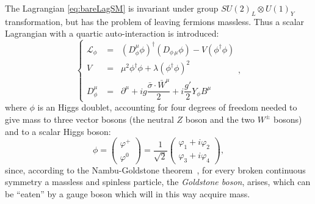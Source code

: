 The Lagrangian \ref{eq:bareLagSM} is invariant under group 
$SU(2)_{L} \otimes U(1)_{Y}$ transformation, but has the 
problem of leaving fermions massless. Thus a scalar 
Lagrangian with a quartic auto-interaction is introduced:
\begin{equation}\label{eq:lagScalar}
\left \{ \begin{array}{cl}
\mathcal{L}_{\phi} &=\;\;  (D_{\phi}^{\mu} \phi)^{\dag}(D_{\phi\,\mu} \phi) - V(\phi^{\dag}\phi)\\
V &=\;\; \mu^{2}\phi^{\dag}\phi + \lambda(\phi^{\dag}\phi)^{2}\\
D_{\phi}^{\mu} &=\;\; \partial^{\mu} + ig\dfrac{\bar{\sigma}\cdot\bar{W}^{\mu}}{2} + i\dfrac{g'}{2}Y_{\phi}B^{\mu}
\end{array}\right. ,
\end{equation}
where $\phi$ is an Higgs doublet, accounting for four 
degrees of freedom needed to give mass to three vector
bosons (the neutral $Z$ boson and the two $W^{\pm}$ bosons)
and to a scalar Higgs boson:
\begin{equation}\label{eq:higgsDoub}
\phi = \begin{pmatrix} \varphi^{+}\\\varphi^{0}
\end{pmatrix} =
\dfrac{1}{\sqrt{2}} 
\begin{pmatrix} \varphi_{1}+i\varphi_{2}\\ \varphi_{3}+i\varphi_{4}\end{pmatrix},
\end{equation}
since, according to the Nambu-Goldstone theorem~\cite{PhysRev.127.965},
for every broken continuous symmetry a massless and spinless particle, 
the {\it Goldstone boson}, arises, which can be ``eaten'' by a gauge 
boson which will in this way acquire mass.


